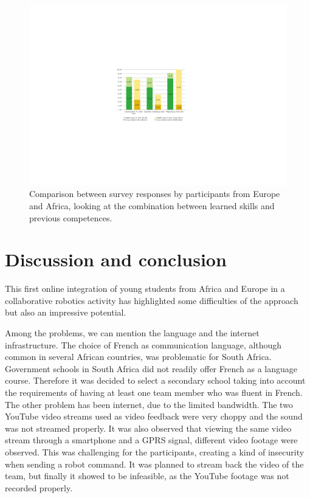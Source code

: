 \documentclass{intech-journal}
\begin{document}
\begin{figure}[ht]
 \centering
    \includegraphics[width=0.6\columnwidth]{figures/EU-SA-learned.pdf}
  \caption{Comparison between survey responses by participants from Europe and Africa, looking at the combination between learned skills and previous competences.}
  \label{fig:EU-SA-learn} 
\end{figure}


\section{Discussion and conclusion}

This first online integration of young students from Africa and Europe in a collaborative robotics activity has highlighted some difficulties of the approach but also an impressive potential.

Among the problems, we can mention the language and the internet infrastructure.
The choice of French as communication language, although common in several African countries, was problematic for South Africa.
Government schools in South Africa did not readily offer French as a language course.
Therefore it was decided to select a secondary school taking into account the requirements of having at least one team member who was fluent in French. 
The other problem has been internet, due to the limited bandwidth. 
The two YouTube video streams used as video feedback were very choppy and the sound was not streamed properly.
It was also observed that viewing the same video stream through a smartphone and a GPRS signal, different video footage were observed. 
This was challenging for the participants, creating a kind of insecurity when sending a robot command.
It was planned to stream back the video of the team, but finally it showed to be infeasible, as the YouTube footage was not recorded properly.
\end{document}
